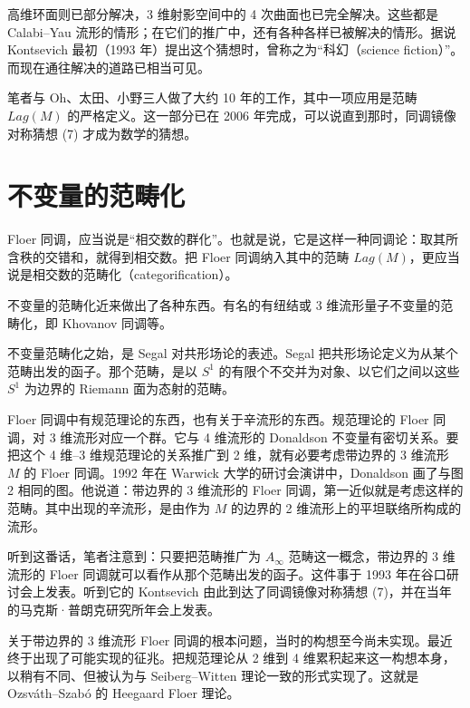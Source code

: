 
高维环面则已部分解决，3 维射影空间中的 4 次曲面也已完全解决。这些都是 Calabi--Yau 流形的情形；在它们的推广中，还有各种各样已被解决的情形。据说 Kontsevich 最初（1993 年）提出这个猜想时，曾称之为“科幻（science fiction）”。而现在通往解决的道路已相当可见。

笔者与 Oh、太田、小野三人做了大约 10 年的工作，其中一项应用是范畴 $Lag(M)$ 的严格定义。这一部分已在 2006 年完成，可以说直到那时，同调镜像对称猜想 (7) 才成为数学的猜想。

\section{不变量的范畴化}

Floer 同调，应当说是“相交数的群化”。也就是说，它是这样一种同调论：取其所含秩的交错和，就得到相交数。把 Floer 同调纳入其中的范畴 $Lag(M)$，更应当说是相交数的范畴化（categorification）。

不变量的范畴化近来做出了各种东西。有名的有纽结或 3 维流形量子不变量的范畴化，即 Khovanov 同调等。

不变量范畴化之始，是 Segal 对共形场论的表述。Segal 把共形场论定义为从某个范畴出发的函子。那个范畴，是以 $S^1$ 的有限个不交并为对象、以它们之间以这些 $S^1$ 为边界的 Riemann 面为态射的范畴。

Floer 同调中有规范理论的东西，也有关于辛流形的东西。规范理论的 Floer 同调，对 3 维流形对应一个群。它与 4 维流形的 Donaldson 不变量有密切关系。要把这个 4 维--3 维规范理论的关系推广到 2 维，就有必要考虑带边界的 3 维流形 $M$ 的 Floer 同调。1992 年在 Warwick 大学的研讨会演讲中，Donaldson 画了与图 2 相同的图。他说道：带边界的 3 维流形的 Floer 同调，第一近似就是考虑这样的范畴。其中出现的辛流形，是由作为 $M$ 的边界的 2 维流形上的平坦联络所构成的流形。

听到这番话，笔者注意到：只要把范畴推广为 $A_\infty$ 范畴这一概念，带边界的 3 维流形的 Floer 同调就可以看作从那个范畴出发的函子。这件事于 1993 年在谷口研讨会上发表。听到它的 Kontsevich 由此到达了同调镜像对称猜想 (7)，并在当年的马克斯·普朗克研究所年会上发表。

关于带边界的 3 维流形 Floer 同调的根本问题，当时的构想至今尚未实现。最近终于出现了可能实现的征兆。把规范理论从 2 维到 4 维累积起来这一构想本身，以稍有不同、但被认为与 Seiberg--Witten 理论一致的形式实现了。这就是 Ozsváth--Szabó 的 Heegaard Floer 理论。

